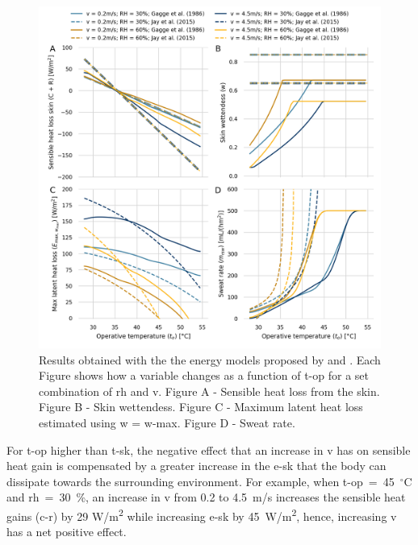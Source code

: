 \begin{figure}[thb!]
    \centering
    \includegraphics[width=\textwidth]{figures/comparison_models_v2.png}
    \caption{Results obtained with the the energy models proposed by  and .
    Each Figure shows how a variable changes as a function of \ac{t-op} for a set combination of \ac{rh} and \ac{v}.
    Figure A - Sensible heat loss from the skin.
    Figure B - Skin wettendess.
    Figure C - Maximum latent heat loss estimated using \ac{w} = \ac{w-max}.
    Figure D - Sweat rate.}
    \label{fig:comparison_models}
\end{figure}



For \ac{t-op} higher than \ac{t-sk}, the negative effect that an increase in \ac{v} has on sensible heat gain is compensated by a greater increase in the \acf{e-sk} that the body can dissipate towards the surrounding environment.
For example, when \ac{t-op}~=~45~$^{\circ}$C and \ac{rh}~=~30~\%, an increase in \ac{v} from 0.2 to 4.5~m/s increases the sensible heat gains (\acs{c-r}) by 29 W/m\textsuperscript{2} while increasing \ac{e-sk} by 45~W/m\textsuperscript{2}, hence, increasing \ac{v} has a net positive effect.

